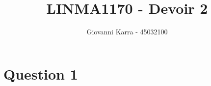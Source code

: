 \documentclass[11pt]{article}
\title{LINMA1170 - Devoir 2}
\author{Giovanni Karra - 45032100}
\begin{document}
\maketitle

\section*{Question 1}
\end{document}
